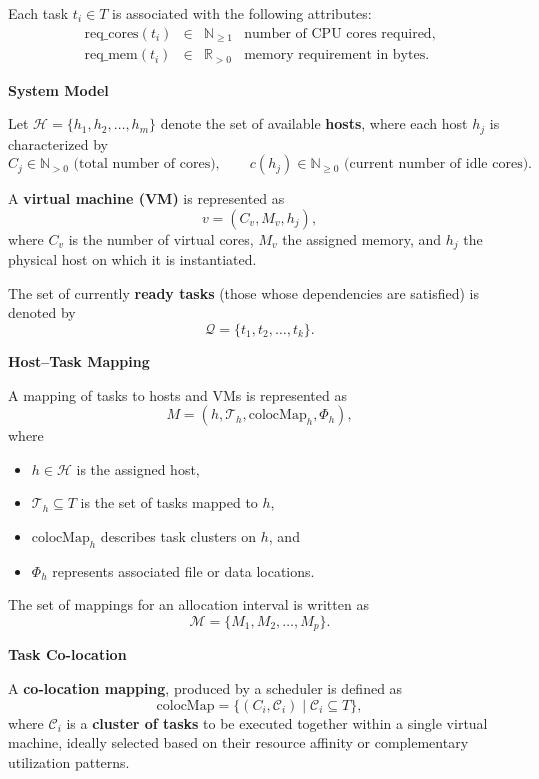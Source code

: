 
Each task \( t_i \in T \) is associated with the following attributes:
\[
    \begin{array}{rcll}
        \text{req\_cores}(t_i) & \in & \mathbb{N}_{\ge 1} & \text{number of CPU cores required}, \\[4pt]
        \text{req\_mem}(t_i)   & \in & \mathbb{R}_{>0}    & \text{memory requirement in bytes.}
    \end{array}
\]

\textbf{System Model}

Let \( \mathcal{H} = \{h_1, h_2, \dots, h_m\} \) denote the set of available \textbf{hosts},
where each host \( h_j \) is characterized by
\[
    C_j \in \mathbb{N}_{>0} \text{ (total number of cores)}, \qquad
    c(h_j) \in \mathbb{N}_{\ge 0} \text{ (current number of idle cores).}
\]

A \textbf{virtual machine (VM)} is represented as
\[
    v = (C_v, M_v, h_j),
\]
where \( C_v \) is the number of virtual cores, \( M_v \) the assigned memory,
and \( h_j \) the physical host on which it is instantiated.

The set of currently \textbf{ready tasks} (those whose dependencies are satisfied) is denoted by
\[
    \mathcal{Q} = \{t_1, t_2, \dots, t_k\}.
\]

\textbf{Host--Task Mapping}

A mapping of tasks to hosts and VMs is represented as
\[
    M = (h, \mathcal{T}_h, \text{colocMap}_h, \Phi_h),
\]
where
\begin{itemize}
    \item $h \in \mathcal{H}$ is the assigned host,
    \item $\mathcal{T}_h \subseteq T$ is the set of tasks mapped to $h$,
    \item $\text{colocMap}_h$ describes task clusters on $h$, and
    \item $\Phi_h$ represents associated file or data locations.
\end{itemize}
The set of mappings for an allocation interval is written as
\[
    \mathcal{M} = \{ M_1, M_2, \dots, M_p \}.
\]

\textbf{Task Co-location}

A \textbf{co-location mapping}, produced by a scheduler is defined as
\[
    \text{colocMap} = \{ (C_i, \mathcal{C}_i) \mid \mathcal{C}_i \subseteq T \},
\]
where $\mathcal{C}_i$ is a \textbf{cluster of tasks} to be executed together within a single virtual machine, ideally selected based on their resource affinity or complementary utilization patterns.



